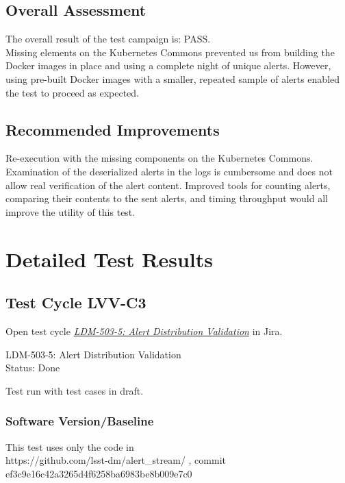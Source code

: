 \documentclass[DM,lsstdraft,STR,toc]{lsstdoc}
\begin{document}
\subsection{Overall Assessment}
\label{sect:overallassessment}

The overall result of the test campaign is:
PASS.\\[2\baselineskip]Missing elements on the Kubernetes Commons
prevented us from building the Docker images in place and using a
complete night of unique alerts. However, using pre-built Docker images
with a smaller, repeated sample of alerts enabled the test to proceed as
expected.


\subsection{Recommended Improvements}
\label{sect:recommendations}

Re-execution with the missing components on the Kubernetes
Commons.\\[2\baselineskip]Examination of the deserialized alerts in the
logs is cumbersome and does not allow real verification of the alert
content. Improved tools for counting alerts, comparing their contents to
the sent alerts, and timing throughput would all improve the utility of
this test.


\newpage
\section{Detailed Test Results}
\label{sect:detailedtestresults}


  \subsection{Test Cycle LVV-C3 }

Open test cycle {\it \href{https://jira.lsstcorp.org/secure/Tests.jspa#/testrun/LVV-C3}{LDM-503-5: Alert Distribution Validation}} in Jira.

  LDM-503-5: Alert Distribution Validation\\
  Status: Done

  Test run with test cases in draft.


  \subsubsection{Software Version/Baseline}
    This test uses only the code in\\
https://github.com/lsst-dm/alert\_stream/ , commit
ef3c9e16c42a3265d4f6258ba6983be8b009e7c0
\end{document}
